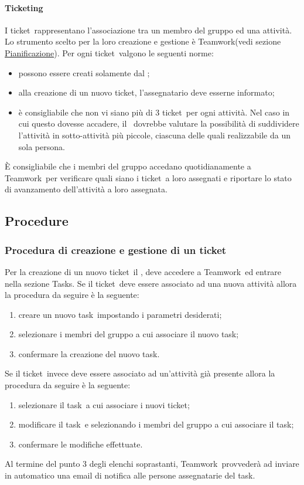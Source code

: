 \documentclass[../NormeProgetto.tex]{subfiles}
\begin{document}
			\paragraph{Ticketing}
			I ticket\g\ rappresentano l'associazione tra un membro del gruppo ed una attività. Lo strumento scelto per la loro creazione e gestione è Teamwork\g (vedi sezione \hyperref[sec: Pianificazione Teamwork]{Pianificazione}). Per ogni ticket\g\ 
valgono le seguenti norme:
			\begin{itemize}
				\item possono essere creati solamente dal \responsabilediprogetto;
				\item alla creazione di un nuovo ticket\g, l'assegnatario deve esserne informato;
				\item è consigliabile che non vi siano più di 3 ticket\g\ per ogni attività. Nel caso in cui questo dovesse accadere, il \responsabilediprogetto\ dovrebbe valutare la possibilità di suddividere l'attività in sotto-attività più piccole, ciascuna delle quali realizzabile da un sola persona.
			\end{itemize}			 
			 È consigliabile che i membri del gruppo accedano quotidianamente a Teamwork\g\ per verificare quali siano i ticket\g\ a loro assegnati e riportare lo stato di avanzamento dell'attività a loro assegnata.
	\subsection{Procedure}
			\subsubsection{Procedura di creazione e gestione di un ticket}				 		Per la creazione di un nuovo ticket\g\ il \responsabilediprogetto, deve accedere a Teamwork\g\ ed entrare nella sezione Tasks. Se il ticket\g\ 
deve essere associato ad una nuova attività allora la procedura da seguire è la seguente:
			\begin{enumerate}
				\item creare un nuovo task\g\ impostando i parametri desiderati;
				\item selezionare i membri del gruppo a cui associare il nuovo task\g;
				\item confermare la creazione del nuovo task\g.
			\end{enumerate}
			Se il ticket\g\ invece deve essere associato ad un'attività già presente allora la procedura da seguire è la seguente:
			\begin{enumerate}
				\item selezionare il task\g\ a cui associare i nuovi ticket\g;
				\item modificare il task\g\ e selezionando i membri del gruppo a cui associare il task\g;
				\item confermare le modifiche effettuate.
			\end{enumerate}
			Al termine del punto 3 degli elenchi soprastanti, Teamwork\g\ provvederà ad inviare in automatico una email di notifica alle persone assegnatarie del task\g.
			
\end{document}
